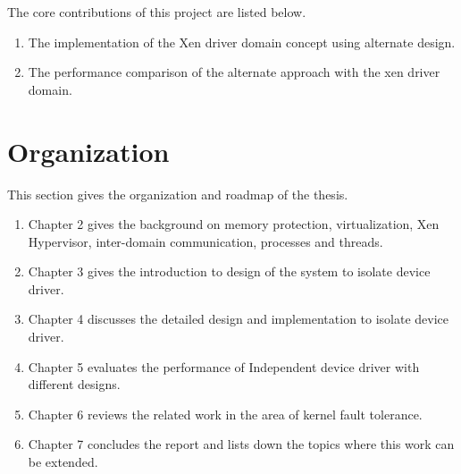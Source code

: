 The core contributions of this project are listed below. 

\begin{enumerate}
\item The implementation of the Xen driver domain concept using alternate design. 
\item The performance comparison of the alternate approach with the xen driver domain.
\end{enumerate}

\pagebreak
\section {Organization}

This section gives the organization and roadmap of the thesis.

\begin{enumerate}
\item Chapter 2 gives the background on memory protection, virtualization, Xen Hypervisor, inter-domain communication, processes and threads. 
\item Chapter 3 gives the introduction to design of the system to isolate device driver. 
\item Chapter 4 discusses the detailed design and implementation to isolate device driver. 
\item Chapter 5 evaluates the performance of Independent device driver with different designs.
\item Chapter 6 reviews the related work in the area of kernel fault tolerance.
\item Chapter 7 concludes the report and lists down the topics where this work can be extended.
\end{enumerate}

